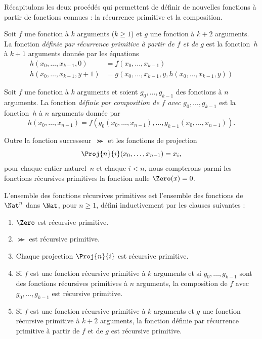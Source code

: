 \documentclass[../../../include/open-logic-section]{subfiles}
\begin{document}

Récapitulons les deux procédés qui permettent de définir de nouvelles
fonctions à partir de fonctions connues : la récurrence primitive
et la composition.

\begin{defn}
   Soit $f$ une fonction à $k$
  arguments ($k\ge 1$) et $g$ une fonction à $k+2$ arguments.
  La fonction \emph{définie par récurrence primitive à partir de
  $f$ et de $g$} est la fonction~$h$ à $k+1$ arguments donnée par
  les équations
  \begin{align*}
    h(x_0,\dots,x_{k-1},0) & =  f(x_0,\dots,x_{k-1}) \\
    h(x_0,\dots,x_{k-1},y+1) & = g(x_0,\dots,x_{k-1}, y, h(x_0,\dots,x_{k-1}, y))
  \end{align*}
\end{defn}

\begin{defn}
   Soit $f$ une fonction à $k$ arguments
  et soient $g_0,\dots,g_{k-1}$ des fonctions à $n$ arguments.
  La fonction \emph{définie par composition de $f$ avec
    $g_0,\dots,g_{k-1}$} est la fonction~$h$ à $n$ arguments
  donnée par
  \[
  h(x_0, \dots, x_{n-1}) =
  f(g_0(x_0, \dots, x_{n-1}), \dots, g_{k-1}(x_0, \dots, x_{n-1})).
  \]
\end{defn}

Outre la fonction successeur~$\Succ$ et les fonctions de projection
\[
\Proj{n}{i}(x_0,\dots,x_{n-1}) = x_i,
\]
pour chaque entier naturel~$n$ et chaque $i<n$, nous compterons
parmi les fonctions récursives primitives la fonction nulle
$\Zero(x)=0$.

\begin{defn}
  L'ensemble des fonctions récursives primitives est l'ensemble
  des fonctions de $\Nat^n$ dans $\Nat$, pour $n\geq1$, défini inductivement
  par les clauses suivantes :
  \begin{enumerate}
  \item $\Zero$ est récursive primitive.
  \item $\Succ$ est récursive primitive.
  \item Chaque projection $\Proj{n}{i}$ est récursive primitive.
  \item Si $f$ est une fonction récursive primitive à $k$ arguments
    et si $g_0,\dots,g_{k-1}$ sont des fonctions récursives
    primitives à $n$ arguments, la composition de $f$ avec
    $g_0,\dots,g_{k-1}$ est récursive primitive.
  \item Si $f$ est une fonction récursive primitive à $k$ arguments
    et $g$ une fonction récursive primitive à $k+2$ arguments,
    la fonction définie par récurrence primitive à partir de
    $f$ et de $g$ est récursive primitive.
  \end{enumerate}
\end{defn}
\end{document}
